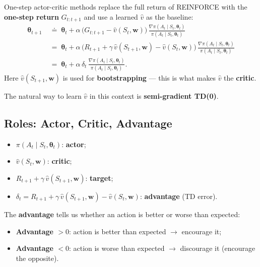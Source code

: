\documentclass[11pt,a4paper]{article}
\theoremstyle{definition}
\theoremstyle{plain}
\theoremstyle{remark}
\begin{document}
One-step actor-critic methods replace the full return of REINFORCE with the \textbf{one-step return} $G_{t:t+1}$ and use a learned $\hat{v}$ as the baseline:
\begin{align*}
    \boldsymbol{\theta}_{t+1} \;&\doteq\; \boldsymbol{\theta}_t + \alpha\, \bigl(G_{t:t+1} - \hat{v}(S_t, \mathbf{w})\bigr)\, \frac{\nabla \pi(A_t \mid S_t, \boldsymbol{\theta}_t)}{\pi(A_t \mid S_t, \boldsymbol{\theta}_t)} \\
                                &=\; \boldsymbol{\theta}_t + \alpha\, \bigl(R_{t+1} + \gamma\, \hat{v}(S_{t+1}, \mathbf{w}) - \hat{v}(S_t, \mathbf{w})\bigr)\, \frac{\nabla \pi(A_t \mid S_t, \boldsymbol{\theta}_t)}{\pi(A_t \mid S_t, \boldsymbol{\theta}_t)} \\
                                &=\; \boldsymbol{\theta}_t + \alpha\, \delta_t\, \frac{\nabla \pi(A_t \mid S_t, \boldsymbol{\theta}_t)}{\pi(A_t \mid S_t, \boldsymbol{\theta}_t)}.
\end{align*}
Here $\hat{v}(S_{t+1}, \mathbf{w})$ is used for \textbf{bootstrapping} — this is what makes $\hat{v}$ the \textbf{critic}.

The natural way to learn $\hat{v}$ in this context is \textbf{semi-gradient TD(0)}.

\subsection{Roles: Actor, Critic, Advantage}

\begin{tcolorbox}[colback=blue!5!white, colframe=blue!60!black, title={Components of Actor-Critic}]
\begin{itemize}
    \item $\pi(A_t \mid S_t, \boldsymbol{\theta}_t)$: \textbf{actor};
    \item $\hat{v}(S_t, \mathbf{w})$: \textbf{critic};
    \item $R_{t+1} + \gamma\, \hat{v}(S_{t+1}, \mathbf{w})$: \textbf{target};
    \item $\delta_t = R_{t+1} + \gamma\, \hat{v}(S_{t+1}, \mathbf{w}) - \hat{v}(S_t, \mathbf{w})$: \textbf{advantage} (TD error).
\end{itemize}
\end{tcolorbox}

The \textbf{advantage} tells us whether an action is better or worse than expected:
\begin{itemize}
    \item \textbf{Advantage $> 0$}: action is better than expected $\to$ encourage it;
    \item \textbf{Advantage $< 0$}: action is worse than expected $\to$ discourage it (encourage the opposite).
\end{itemize}
\end{document}
